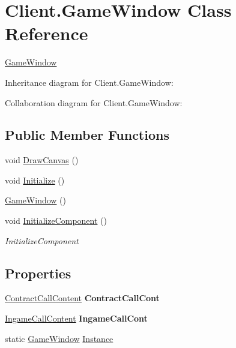 \hypertarget{class_client_1_1_game_window}{}\section{Client.\+Game\+Window Class Reference}
\label{class_client_1_1_game_window}


\hyperlink{class_client_1_1_game_window}{Game\+Window}  




Inheritance diagram for Client.\+Game\+Window\+:


Collaboration diagram for Client.\+Game\+Window\+:
\subsection*{Public Member Functions}
\begin{DoxyCompactItemize}
\item 
void \hyperlink{class_client_1_1_game_window_a1b9e58d7bc70991ee087369c7c6bc659}{Draw\+Canvas} ()
\item 
void \hyperlink{class_client_1_1_game_window_a1fc43a939c13e466c4f9d031cab17d21}{Initialize} ()
\item 
\hyperlink{class_client_1_1_game_window_afc1d45d2b704a4daf6a669e3e0e28f5f}{Game\+Window} ()
\item 
void \hyperlink{class_client_1_1_game_window_a22d0fc5b8dc7a9e2a25e68ac5a3655fd}{Initialize\+Component} ()
\begin{DoxyCompactList}\small\item\em Initialize\+Component \end{DoxyCompactList}\end{DoxyCompactItemize}
\subsection*{Properties}
\begin{DoxyCompactItemize}
\item 
\mbox{\label{class_client_1_1_game_window_ac00c53c118c8055a831c72371468b6ef}} 
\hyperlink{class_client_1_1_contract_call_content}{Contract\+Call\+Content} {\bfseries Contract\+Call\+Cont}
\item 
\mbox{\label{class_client_1_1_game_window_a49a10171282d3ec6501fcfcce91f87c1}} 
\hyperlink{class_client_1_1_ingame_call_content}{Ingame\+Call\+Content} {\bfseries Ingame\+Call\+Cont}
\item 
static \hyperlink{class_client_1_1_game_window}{Game\+Window} \hyperlink{class_client_1_1_game_window_acc8143b52bf52de1b9fbdb2bd21e1cb1}{Instance}
\end{DoxyCompactItemize}


